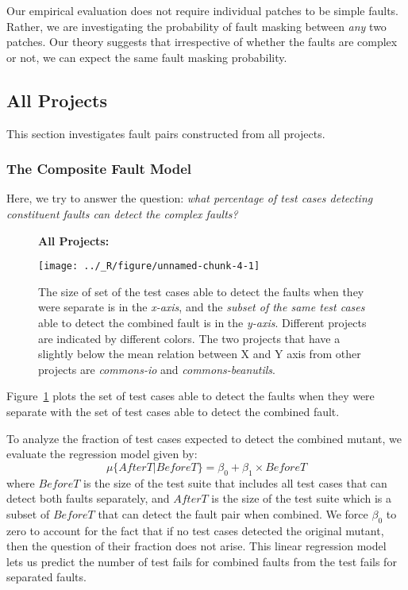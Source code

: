 \documentclass[preprint,nonatbib]{sigplanconf}\usepackage[]{graphicx}\usepackage[]{color}
\begin{document}
Our empirical evaluation does not require individual patches to be simple
faults. Rather, we are investigating the probability of fault masking
between \emph{any} two patches. Our theory suggests that irrespective of
whether the faults are complex or not, we can expect the same fault masking
probability.

\subsection{All Projects}
This section investigates fault pairs constructed from all projects.
\subsubsection{The Composite Fault Model}
Here, we try to answer the question: \emph{what percentage of test cases
detecting constituent faults can detect the complex faults?}

\begin{figure}[t]
\centering\textbf{All Projects: \couplingC}\par\medskip


{\centering \texttt{[image: ../\_R/figure/unnamed-chunk-4-1]} 

}


\caption{The size of set of the test cases able to detect the faults when they were separate is in the \emph{x-axis},
and the \emph{subset of the same test cases} able to detect the combined fault is in the \emph{y-axis}. Different projects
are indicated by different colors.
The two projects that have a slightly below the mean relation between X and Y axis from other projects are \emph{commons-io} and \emph{commons-beanutils}.}
\label{fig:allfaults}
\end{figure}

Figure~\ref{fig:allfaults} plots the set of test cases able to detect
the faults when they were separate with the set of test cases able to
detect the combined fault.

To analyze the fraction of test cases expected to detect the combined mutant,
we evaluate the regression model given by:
\begin{equation}
\mu\{AfterT | BeforeT \} = \beta_0 + \beta_1 \times BeforeT
\label{eq:e1}
\end{equation}
where $BeforeT$ is the size of the test suite that includes all test cases that
can detect both faults separately, and $AfterT$ is the size of the test suite
which is a subset of $BeforeT$ that can detect the fault pair when combined.
We force $\beta_0$ to zero to account for the fact that if no test cases
detected the original mutant, then the question of their fraction does not
arise.
This linear regression model lets us predict the number of test fails for
combined faults from the test fails for separated faults.
\end{document}
